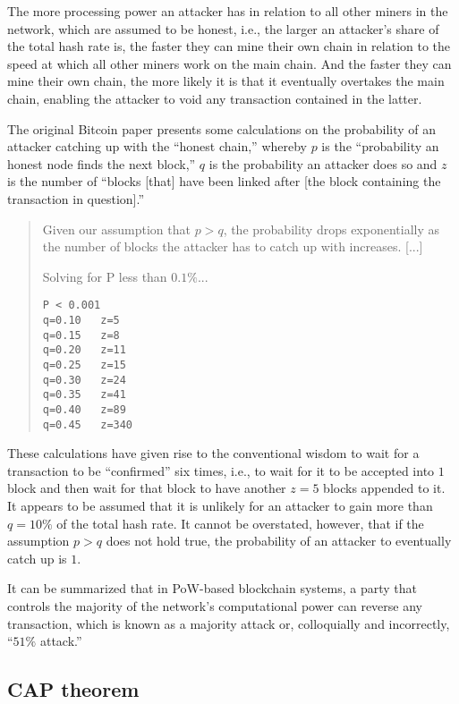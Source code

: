 The more processing power an attacker has in relation to all other miners in the network, which are assumed to be honest, i.e., the larger an attacker's share of the total hash rate is, the faster they can mine their own chain in relation to the speed at which all other miners work on the main chain.
And the faster they can mine their own chain, the more likely it is that it eventually overtakes the main chain, enabling the attacker to void any transaction contained in the latter.

The original Bitcoin paper presents some calculations on the probability of an attacker catching up with the ``honest chain,'' whereby \(p\) is the ``probability an honest node finds the next block,'' \(q\) is the probability an attacker does so and \(z\) is the number of ``blocks [that] have been linked after [the block containing the transaction in question].''

\begin{quote}
Given our assumption that \(p > q\), the probability drops exponentially as the number of blocks the attacker has to catch up with increases. [...]
  
Solving for P less than \(0.1\%\)...
  
\begin{verbatim}
P < 0.001
q=0.10   z=5
q=0.15   z=8
q=0.20   z=11
q=0.25   z=15
q=0.30   z=24
q=0.35   z=41
q=0.40   z=89
q=0.45   z=340
\end{verbatim}
\end{quote}

These calculations have given rise to the conventional wisdom to wait for a transaction to be ``confirmed'' \autocite{bitcoinwiki2018confirmation} six times, i.e., to wait for it to be accepted into \(1\) block and then wait for that block to have another \(z=5\) blocks appended to it.
It appears to be assumed that it is unlikely for an attacker to gain more than \(q = 10\%\) of the total hash rate.
It cannot be overstated, however, that if the assumption \(p > q\) does not hold true, the probability of an attacker to eventually catch up is \(1\).

It can be summarized that in PoW-based blockchain systems, a party that controls the majority of the network's computational power can reverse any transaction, which is known as a majority attack or, colloquially and incorrectly, ``\(51\%\) attack.''

\subsection{CAP theorem}

